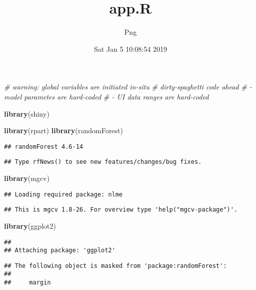 \documentclass[]{article}
\title{app.R}
\author{Png}
\date{Sat Jan 5 10:08:54 2019}
\newenvironment{Shaded}{\begin{snugshade}}{\end{snugshade}}
\newcommand{\KeywordTok}[1]{\textcolor[rgb]{0.13,0.29,0.53}{\textbf{#1}}}
\newcommand{\CommentTok}[1]{\textcolor[rgb]{0.56,0.35,0.01}{\textit{#1}}}
\newcommand{\NormalTok}[1]{#1}
\begin{document}
\maketitle

\begin{Shaded}
\begin{Highlighting}[]
\CommentTok{# warning: global variables are initiated in-situ}
\CommentTok{# dirty-spaghetti code ahead}
\CommentTok{#   - model parametes are hard-coded}
\CommentTok{#   - UI data ranges are hard-coded}

\KeywordTok{library}\NormalTok{(shiny)}

\KeywordTok{library}\NormalTok{(rpart)}
\KeywordTok{library}\NormalTok{(randomForest)}
\end{Highlighting}
\end{Shaded}

\begin{verbatim}
## randomForest 4.6-14
\end{verbatim}

\begin{verbatim}
## Type rfNews() to see new features/changes/bug fixes.
\end{verbatim}

\begin{Shaded}
\begin{Highlighting}[]
\KeywordTok{library}\NormalTok{(mgcv)}
\end{Highlighting}
\end{Shaded}

\begin{verbatim}
## Loading required package: nlme
\end{verbatim}

\begin{verbatim}
## This is mgcv 1.8-26. For overview type 'help("mgcv-package")'.
\end{verbatim}

\begin{Shaded}
\begin{Highlighting}[]
\KeywordTok{library}\NormalTok{(ggplot2)}
\end{Highlighting}
\end{Shaded}

\begin{verbatim}
## 
## Attaching package: 'ggplot2'
\end{verbatim}

\begin{verbatim}
## The following object is masked from 'package:randomForest':
## 
##     margin
\end{verbatim}
\end{document}
